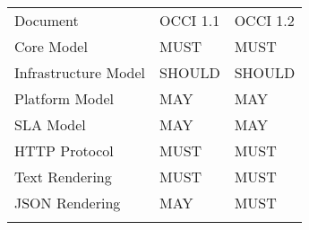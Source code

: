 {
	\begin{tabular}{lll}
	\toprule
	Document & OCCI 1.1 & OCCI 1.2 \\
	\colrule
	Core Model & MUST & MUST \\
	Infrastructure Model  & SHOULD & SHOULD \\
	Platform Model & MAY & MAY \\
	SLA Model & MAY & MAY \\
	HTTP Protocol & MUST & MUST \\
	Text Rendering& MUST & MUST \\
	JSON Rendering& MAY & MUST \\
	\botrule
	\end{tabular}
}
